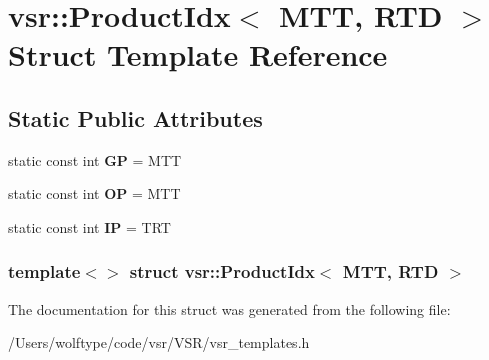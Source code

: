 \hypertarget{structvsr_1_1_product_idx_3_01_m_t_t_00_01_r_t_d_01_4}{\section{vsr\-:\-:Product\-Idx$<$ M\-T\-T, R\-T\-D $>$ Struct Template Reference}
\label{structvsr_1_1_product_idx_3_01_m_t_t_00_01_r_t_d_01_4}
}
\subsection*{Static Public Attributes}
\begin{DoxyCompactItemize}
\item 
\hypertarget{structvsr_1_1_product_idx_3_01_m_t_t_00_01_r_t_d_01_4_a7ec9c66f201bdfbbe918d67dfdf87a2c}{static const int {\bfseries G\-P} = M\-T\-T}\label{structvsr_1_1_product_idx_3_01_m_t_t_00_01_r_t_d_01_4_a7ec9c66f201bdfbbe918d67dfdf87a2c}

\item 
\hypertarget{structvsr_1_1_product_idx_3_01_m_t_t_00_01_r_t_d_01_4_a789aada3eee44a1ddc0847afe25c6692}{static const int {\bfseries O\-P} = M\-T\-T}\label{structvsr_1_1_product_idx_3_01_m_t_t_00_01_r_t_d_01_4_a789aada3eee44a1ddc0847afe25c6692}

\item 
\hypertarget{structvsr_1_1_product_idx_3_01_m_t_t_00_01_r_t_d_01_4_a77090c52d92a172389954c3881b4f5ca}{static const int {\bfseries I\-P} = T\-R\-T}\label{structvsr_1_1_product_idx_3_01_m_t_t_00_01_r_t_d_01_4_a77090c52d92a172389954c3881b4f5ca}

\end{DoxyCompactItemize}
\subsubsection*{template$<$$>$ struct vsr\-::\-Product\-Idx$<$ M\-T\-T, R\-T\-D $>$}



The documentation for this struct was generated from the following file\-:\begin{DoxyCompactItemize}
\item 
/\-Users/wolftype/code/vsr/\-V\-S\-R/vsr\-\_\-templates.\-h\end{DoxyCompactItemize}
